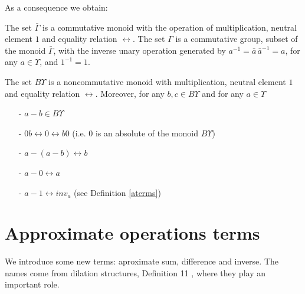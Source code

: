 \documentclass{article}
\begin{document}
As a consequence we obtain: 

\begin{proposition}
The set $\displaystyle \bar{\Gamma}$ is a commutative monoid with the operation of multiplication, neutral element $1$ and equality relation $\longleftrightarrow$. The set $\Gamma$ is a commutative group, subset of the monoid  $\displaystyle \bar{\Gamma}$, with the inverse unary operation generated by $\displaystyle a^{-1} = \bar{a} \, \bar{a}^{-1} = a$, for any $a \in \Upsilon$, and $\displaystyle 1^{-1} = 1$. 

The set $B\Upsilon$ is a noncommutative monoid with multiplication, neutral element $1$ and equality relation $\longleftrightarrow$. Moreover, for any $b, c \in B\Upsilon$ and for any $a \in \Upsilon$
\begin{enumerate}
\item[-] $a-b \in B\Upsilon$
\item[-] $0b \longleftrightarrow 0 \longleftrightarrow b0$ (i.e. $0$ is an absolute of the monoid $B\Upsilon$)
\item[-] $a-(a-b) \longleftrightarrow b$
\item[-] $a-0 \longleftrightarrow a$
\item[-] $\displaystyle a-1 \longleftrightarrow inv_{a}$ (see Definition \ref{aterms})
\end{enumerate}
\end{proposition}


\section{Approximate operations terms}

We introduce some new terms: aproximate sum, difference and inverse. The names come from dilation structures, Definition 11 \cite{buligadil1},  where they play an important role. 
\end{document}

